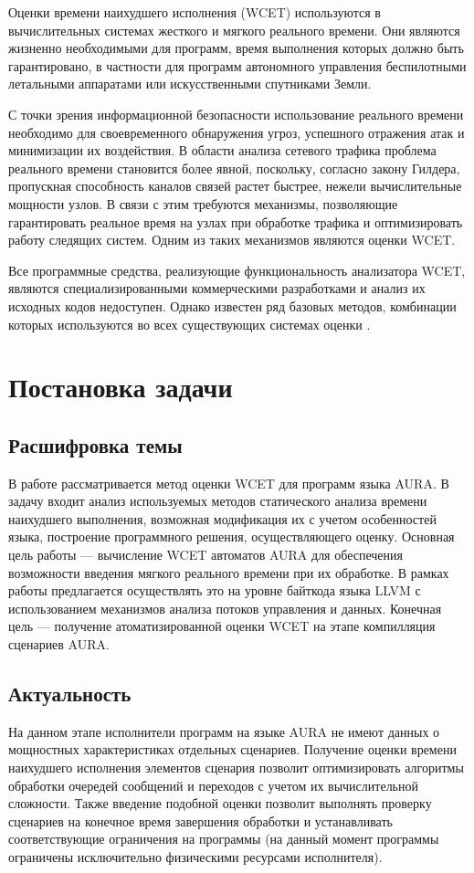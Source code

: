 \documentclass[12pt,a4paper]{article}
\begin{document}
Оценки времени наихудшего исполнения (WCET) используются в вычислительных системах жесткого и мягкого реального времени. Они являются жизненно необходимыми для программ, время выполнения которых должно быть гарантировано, в частности для программ автономного управления беспилотными летальными аппаратами или искусственными спутниками Земли.

С точки зрения информационной безопасности использование реального времени необходимо для своевременного обнаружения угроз, успешного отражения атак и минимизации их воздействия. В области анализа сетевого трафика проблема реального времени становится более явной, поскольку, согласно закону Гилдера, пропускная способность каналов связей растет быстрее, нежели вычислительные мощности узлов. В связи с этим требуются механизмы, позволяющие гарантировать реальное время на узлах при обработке трафика и оптимизировать работу следящих систем. Одним из таких механизмов являются оценки WCET.

Все программные средства, реализующие функциональность анализатора WCET, являются специализированными коммерческими разработками и анализ их исходных кодов недоступен. Однако известен ряд базовых методов, комбинации которых используются во всех существующих системах оценки  \cite{comsurvey}.

\section{Постановка задачи}

\subsection{Расшифровка темы}
В работе рассматривается метод оценки WCET для программ языка AURA. В задачу входит анализ используемых методов статического анализа времени наихудшего выполнения, возможная модификация их с учетом особенностей языка, построение программного решения, осуществляющего оценку. Основная цель работы --- вычисление WCET автоматов AURA для обеспечения возможности введения мягкого реального времени при их обработке. В рамках работы предлагается осуществлять это на уровне байткода языка LLVM с использованием механизмов анализа потоков управления и данных. Конечная цель --- получение атоматизированной оценки WCET на этапе компилляция сценариев AURA.

\subsection{Актуальность}
На данном этапе исполнители программ на языке AURA не имеют данных о мощностных характеристиках отдельных сценариев. Получение оценки времени наихудшего исполнения элементов сценария позволит оптимизировать алгоритмы обработки очередей сообщений и переходов с учетом их вычислительной сложности. Также введение подобной оценки позволит выполнять проверку сценариев на конечное время завершения обработки и устанавливать соответствующие ограничения на программы (на данный момент программы ограничены исключительно физическими ресурсами исполнителя).
\end{document}
